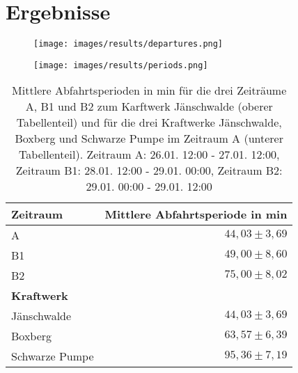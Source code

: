 \section{Ergebnisse}


\begin{figure}[H]
	\centering
	\texttt{[image: images/results/departures.png]}
	\caption{}
	\label{fig:results-departures}
\end{figure}

\begin{figure}[H]
	\centering
	\texttt{[image: images/results/periods.png]}
	\caption{}
	\label{fig:results-periods}
\end{figure}


\begin{table}[!ht]
	\centering
	\caption{Mittlere Abfahrtsperioden in min für die drei Zeiträume A, B1 und B2 zum Karftwerk Jänschwalde (oberer Tabellenteil) und für die drei Kraftwerke Jänschwalde, Boxberg und Schwarze Pumpe im Zeitraum A (unterer Tabellenteil). Zeitraum A: 26.01. 12:00 - 27.01. 12:00, Zeitraum B1: 28.01. 12:00 - 29.01. 00:00, Zeitraum B2: 29.01. 00:00 - 29.01. 12:00}
	\label{tab:results}
	\begin{tabular}{|l|r|}
		\hline
		\textbf{Zeitraum} & \textbf{Mittlere Abfahrtsperiode in min} \\
		\hline
		\hline
		A & $44,03 \pm 3,69$\\
		\hline
		B1 & $49,00 \pm 8,60$\\
		\hline
        B2 & $75,00 \pm 8,02$\\
		\hline
		\hline
        \textbf{Kraftwerk} & \\
		\hline
		\hline
        Jänschwalde & $44,03 \pm 3,69$\\
		\hline
        Boxberg & $63,57 \pm 6,39$\\
		\hline
		Schwarze Pumpe & $95,36 \pm 7,19$\\
		\hline
	\end{tabular}
\end{table}